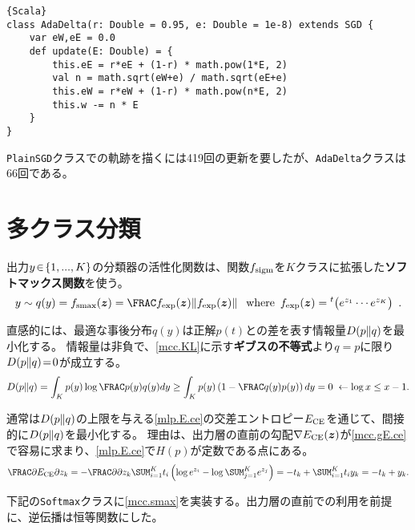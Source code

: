 \documentclass[10pt,a4paper]{book}
\begin{document}
\begin{Verbatim}{Scala}
class AdaDelta(r: Double = 0.95, e: Double = 1e-8) extends SGD {
	var eW,eE = 0.0
	def update(E: Double) = {
		this.eE = r*eE + (1-r) * math.pow(1*E, 2)
		val n = math.sqrt(eW+e) / math.sqrt(eE+e)
		this.eW = r*eW + (1-r) * math.pow(n*E, 2)
		this.w -= n * E
	}
}
\end{Verbatim}

\texttt{PlainSGD}クラスでの軌跡を描くには419回の更新を要したが、\texttt{AdaDelta}クラスは66回である。

\section{多クラス分類\label{sect:nn.mcp}}

出力$y\!\in\!\seq{1,...,K}$の分類器の活性化関数は、関数$f_\mathrm{sigm}$を$K$クラスに拡張した\textbf{ソフトマックス関数}を使う。
%
\begin{equation}
\label{eq:mcc.smax}
y \sim q(y) = \smax(\bm{z}) = \frac{f_\mathrm{exp}(\bm{z})}{\|f_\mathrm{exp}(\bm{z})\|}\;
\where f_\mathrm{exp}(\bm{z}) = \trans{\begin{pmatrix}e^{z_1} \cdots e^{z_K}\end{pmatrix}}.
\end{equation}

直感的には、最適な事後分布$q(y)$は正解$p(t)$との差を表す\nKL 情報量$D\!\left(p\|q\right)$を最小化する。
\nKL 情報量は非負で、\eqref{mcc.KL}に示す\textbf{ギブスの不等式}より$q\!=\!p$に限り$D\!\left(p\|q\right)\!=\!0$が成立する。
%
\begin{equation}
\label{eq:mcc.KL}
\KL{p}{q} = \int_K p(y) \log \frac{p(y)}{q(y)} dy \geq \int_K p(y) \left(1-\frac{q(y)}{p(y)}\right) dy = 0\;\leftarrow \log x \leq x-1.
\end{equation}

通常は$D\!\left(p\|q\right)$の上限を与える\eqref{mlp.E.ce}の交差エントロピー$E_\mathrm{CE}$を通じて、間接的に$D\!\left(p\|q\right)$を最小化する。
理由は、出力層の直前の勾配$\nabla{}E_\mathrm{CE}(\bm{z})$が\eqref{mcc.gE.ce}で容易に求まり、\eqref{mlp.E.ce}で$H(p)$が定数である点にある。
%
\begin{equation}
\label{eq:mcc.gE.ce}
\pdiff{\Ece}{z_k}
= - \pdiff{}{z_k} \sum_{i=1}^K t_i \left(\log e^{z_i} - \log \sum_{j=1}^K e^{z_j}\right)
= - t_k + \sum_{i=1}^K t_i y_k = -t_k + y_k.
\end{equation}

下記の\texttt{Softmax}クラスに\eqref{mcc.smax}を実装する。出力層の直前での利用を前提に、逆伝播は恒等関数にした。
\end{document}
